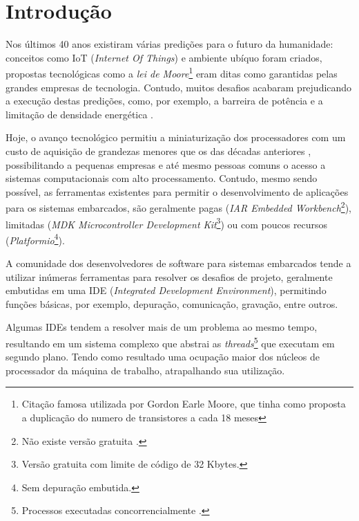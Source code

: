 \chapter{Introdução}
Nos últimos 40 anos existiram várias predições para o futuro da humanidade: conceitos como IoT (\textit{Internet Of Things}) \cite{gates1995estrada} e ambiente ubíquo \cite{weiser1991computer} foram criados, propostas tecnológicas como a \textit{lei de Moore}\footnote{Citação famosa utilizada por Gordon Earle Moore, que tinha como proposta a duplicação do numero de transistores a cada 18 meses} eram ditas como garantidas pelas grandes empresas de tecnologia. Contudo, muitos desafios acabaram prejudicando a execução destas predições, como, por exemplo, a barreira de potência \cite{Patterson:2008:COD:1502247} e a limitação de densidade energética \cite{paradiso2005energy}.

Hoje, o avanço tecnológico permitiu a miniaturização dos processadores com um custo de aquisição de grandezas menores que os das décadas anteriores \cite{nordhaus2007two}, possibilitando a pequenas empresas e até mesmo pessoas comuns o acesso a sistemas computacionais com alto processamento. Contudo, mesmo	 sendo possível, as ferramentas existentes para permitir o desenvolvimento de aplicações para os sistemas embarcados, são geralmente pagas (\textit{IAR Embedded Workbench}\footnote{Não existe versão gratuita \cite{buyiar}.}), limitadas (\textit{MDK Microcontroller Development Kit}\footnote{Versão gratuita com limite de código de 32 Kbytes.}) ou com poucos recursos (\textit{Platformio}\footnote{Sem depuração embutida.}).

A comunidade dos desenvolvedores de software para sistemas embarcados tende a utilizar inúmeras ferramentas para resolver os desafios de projeto, geralmente embutidas em uma IDE (\textit{Integrated Development Environment}), permitindo funções básicas, por exemplo, depuração, comunicação, gravação, entre outros.

Algumas IDEs tendem a resolver mais de um problema ao mesmo tempo, resultando em um sistema complexo que abstrai as \textit{threads}\footnote{Processos executadas concorrencialmente \cite{Patterson:2008:COD:1502247}.} que executam em segundo plano. Tendo como resultado uma ocupação maior dos núcleos de processador da máquina de trabalho, atrapalhando sua utilização.

\iffalse
O intuito deste trabalho é a realização de um sistema para possibilitar aos desenvolvedores a programação de sistemas embarcados, sem a necessidade de utilizar sistemas assistencialistas que possam limitar a evolução do trabalho ou a utilização do produto final concebido.
\fi

